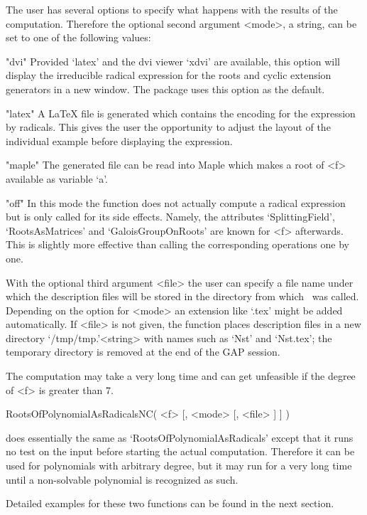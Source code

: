The user has several options to specify what happens with the results
of the computation. Therefore the optional second argument <mode>, a
string, can be set to one of the following values:

\beginexample
"dvi"
\endexample
Provided `latex' and the dvi viewer `xdvi' are available, this option
will display the irreducible radical expression for the roots and
cyclic extension generators in a new window. The package uses this
option as the default.

\beginexample
"latex"
\endexample
A LaTeX file is generated which contains the encoding for the
expression by radicals. This gives the user the opportunity to adjust
the layout of the individual example before displaying the expression.

\beginexample
"maple"
\endexample
The generated file can be read into Maple \cite{Maple10} which makes a root
of <f> available as variable `a'.

\beginexample
"off"
\endexample
In this mode the function does not actually compute a radical
expression but is only called for its side effects. Namely, the
attributes `SplittingField', `RootsAsMatrices' and
`GaloisGroupOnRoots' are known for <f> afterwards. This is slightly
more effective than calling the corresponding operations one by one.

With the optional third argument <file> the user can specify a
file name under which the description files will be stored in the 
directory from which \GAP\ was called. Depending on the option for
<mode> an extension like `.tex' might be added automatically. 
If <file> is not given, the function places description files in a new
directory `/tmp/tmp.'<string> with names such as `Nst' and `Nst.tex';
the temporary directory is removed at the end of the {\sf GAP}
session.

The computation may take a very long time and can get unfeasible if the
degree of <f> is greater than 7.
\beginexample
\endexample

\> RootsOfPolynomialAsRadicalsNC( <f> [, <mode> [, <file> ] ] )

does essentially the same as `RootsOfPolynomialAsRadicals' except
that it runs no test on the input before starting the actual
computation. Therefore it can be used for polynomials with arbitrary
degree, but it may run for a very long time until a
non-solvable polynomial is recognized as such.

Detailed examples for these two functions can be found in the next section.

